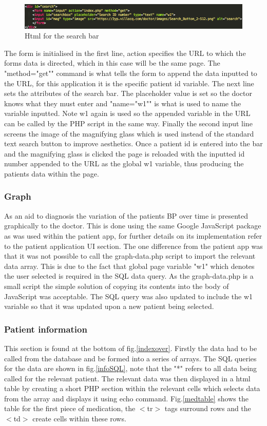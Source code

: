 \documentclass[11pt]{article}
\begin{document}
\begin{figure}
\centering
\includegraphics[scale=0.4]{searchbarhtml.png}
\caption{Html for the search bar \label{searchbarhtml}} 
\end{figure}
The form is initialised in the first line, action specifies the URL to which the forms data is directed, which in this case will be the same page. The "method="get"" command is what tells the form to append the data inputted to the URL, for this application it is the specific patient id variable. The next line sets the attributes of the search bar. The placeholder value is set so the doctor knows what they must enter and "name="w1"" is what is used to name the variable inputted. Note w1 again is used so the appended variable in the URL can be called by the PHP script in the same way. Finally the second input line screens the image of the magnifying glass which is used instead of the standard text search button to improve aesthetics. Once a patient id is entered into the bar and the magnifying glass is clicked the page is reloaded with the inputted id number appended to the URL as the global w1 variable, thus producing the patients data within the page. 

\subsubsection{Graph}
As an aid to diagnosis the variation of the patients BP over time is presented graphically to the doctor. This is done using the same Google JavaScript package as was used within the patient app, for further details on its implementation refer to the patient application UI section. The one difference from the patient app was that it was not possible to call the graph-data.php script to import the relevant data array. This is due to the fact that global page variable "w1" which denotes the user selected is required in the SQL data query. As the graph-data.php is a small script the simple solution of copying its contents into the body of JavaScript was acceptable. The SQL query was also updated to include the w1 variable so that it was updated upon a new patient being selected. 

\subsubsection{Patient information}
This section is found at the bottom of fig.\ref{indexover}. Firstly the data had to be called from the database and be formed into a series of arrays. The SQL queries for the data are shown in fig.\ref{infoSQL}, note that the "*" refers to all data being called for the relevant patient. The relevant data was then displayed in a html table by creating a short PHP section within the relevant cells which selects data from the array and displays it using echo command. Fig.\ref{medtable} shows the table for the first piece of medication, the $<$tr$>$ tags surround rows and the $<$td$>$ create cells within these rows. 
\end{document}
